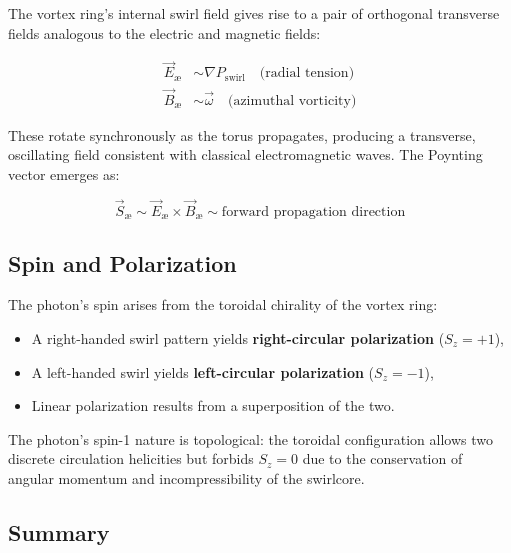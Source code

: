 The vortex ring’s internal swirl field gives rise to a pair of orthogonal transverse fields analogous to the electric and magnetic fields:

\begin{align}
    \vec{E}_\text{æ} &\sim \nabla P_{\text{swirl}} \quad \text{(radial tension)} \\
    \vec{B}_\text{æ} &\sim \vec{\omega} \quad \text{(azimuthal vorticity)}
\end{align}

\noindent
These rotate synchronously as the torus propagates, producing a transverse, oscillating field consistent with classical electromagnetic waves. The Poynting vector emerges as:

\begin{equation}
    \vec{S}_\text{æ} \sim \vec{E}_\text{æ} \times \vec{B}_\text{æ} \sim \text{forward propagation direction}
\end{equation}

\subsection{Spin and Polarization}

The photon’s spin arises from the toroidal chirality of the vortex ring:

\begin{itemize}
    \item A right-handed swirl pattern yields \textbf{right-circular polarization} ($S_z = +1$),
    \item A left-handed swirl yields \textbf{left-circular polarization} ($S_z = -1$),
    \item Linear polarization results from a superposition of the two.
\end{itemize}

The photon's spin-1 nature is topological: the toroidal configuration allows two discrete circulation helicities but forbids $S_z = 0$ due to the conservation of angular momentum and incompressibility of the swirlcore.

\subsection{Summary}

